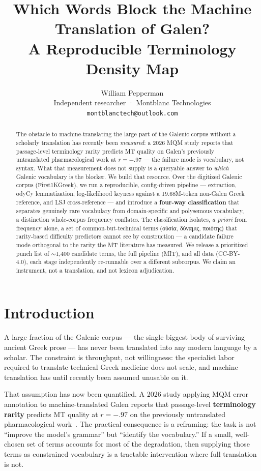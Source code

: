 \documentclass[11pt]{article}
\title{Which Words Block the Machine Translation of Galen?\\
A Reproducible Terminology Density Map}
\author{William Pepperman \\
  Independent researcher · Montblanc Technologies \\
  \texttt{montblanctech@outlook.com}}
\begin{document}
\maketitle

\begin{abstract}
The obstacle to machine-translating the large part of the Galenic corpus without a scholarly translation has recently been
\textit{measured}: a 2026 MQM study reports that passage-level terminology rarity predicts MT quality on
Galen's previously untranslated pharmacological work at $r = -.97$ --- the failure mode is vocabulary, not syntax. What that measurement does not
supply is a queryable answer to \textit{which} Galenic vocabulary is the blocker. We build that resource.
Over the digitized Galenic corpus (First1KGreek), we run a reproducible, config-driven pipeline ---
extraction, odyCy lemmatization, log-likelihood keyness against a 19.68M-token non-Galen Greek
reference, and LSJ cross-reference --- and introduce a \textbf{four-way classification} that separates
genuinely rare vocabulary from domain-specific and polysemous vocabulary, a distinction
whole-corpus frequency conflates. The classification isolates, \textit{a priori} from frequency alone,
a set of common-but-technical terms (οὐσία, δύναμις, ποιότης) that rarity-based difficulty predictors
cannot see by construction --- a candidate failure mode orthogonal to the rarity the MT literature
has measured. We release a prioritized punch list of ${\sim}$1,400 candidate terms, the full pipeline (MIT),
and all data (CC-BY-4.0), each stage independently re-runnable over a different subcorpus. We claim
an instrument, not a translation, and not lexicon adjudication.
\end{abstract}

\section{Introduction}
\label{sec:intro}

A large fraction of the Galenic corpus --- the single biggest body of surviving ancient Greek prose ---
has never been translated into any modern language by a scholar. The constraint is throughput, not willingness:
the specialist labor required to translate technical Greek medicine does not scale, and machine
translation has until recently been assumed unusable on it.

That assumption has now been quantified. A 2026 study applying MQM error annotation to
machine-translated Galen reports that passage-level \textbf{terminology rarity} predicts MT quality at
$r = -.97$ on the previously untranslated pharmacological work~\citep{galen-mt-mqm-2026}.
The practical consequence is a reframing: the task is not ``improve the model's grammar'' but ``identify the
vocabulary.'' If a small, well-chosen set of terms accounts for most of the degradation, then
supplying those terms as constrained vocabulary is a tractable intervention where full translation
is not.
\end{document}
